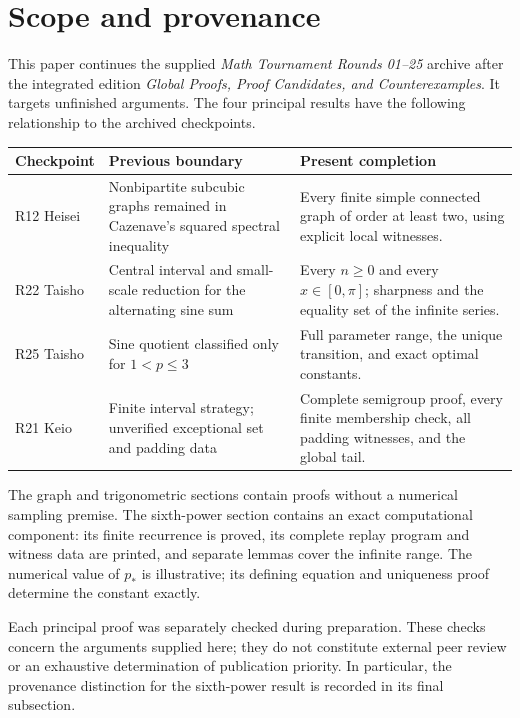 \documentclass[11pt,a4paper]{article}
\numberwithin{equation}{section}
\theoremstyle{remark}
\begin{document}
\clearpage
\tableofcontents
\clearpage
\section*{Scope and provenance}

This paper continues the supplied \emph{Math Tournament Rounds 01--25}
archive after the integrated edition \emph{Global Proofs, Proof
Candidates, and Counterexamples}. It targets unfinished arguments.
The four principal results have the following relationship to the
archived checkpoints.

\begin{center}\small
\begin{tabular}{L{.12\textwidth}L{.32\textwidth}L{.46\textwidth}}
\toprule
Checkpoint & Previous boundary & Present completion\\
\midrule
R12 Heisei & Nonbipartite subcubic graphs remained in Cazenave's squared spectral inequality
& Every finite simple connected graph of order at least two, using explicit local witnesses.\\[5pt]
R22 Taisho & Central interval and small-scale reduction for the alternating sine sum
& Every $n\ge0$ and every $x\in[0,\pi]$; sharpness and the equality set of the infinite series.\\[5pt]
R25 Taisho & Sine quotient classified only for $1<p\le3$
& Full parameter range, the unique transition, and exact optimal constants.\\[5pt]
R21 Keio & Finite interval strategy; unverified exceptional set and padding data
& Complete semigroup proof, every finite membership check, all padding witnesses, and the global tail.\\
\bottomrule
\end{tabular}
\end{center}

The graph and trigonometric sections contain proofs without a numerical
sampling premise. The sixth-power section contains an exact computational component:
its finite recurrence is proved, its complete replay program and
witness data are printed, and separate lemmas cover the infinite
range. The numerical value of $p_*$ is illustrative; its defining
equation and uniqueness proof determine the constant exactly.

Each principal proof was separately checked during preparation.
These checks concern the arguments supplied here; they do not
constitute external peer review or an exhaustive determination of
publication priority. In particular, the provenance distinction for
the sixth-power result is recorded in its final subsection.
\end{document}
